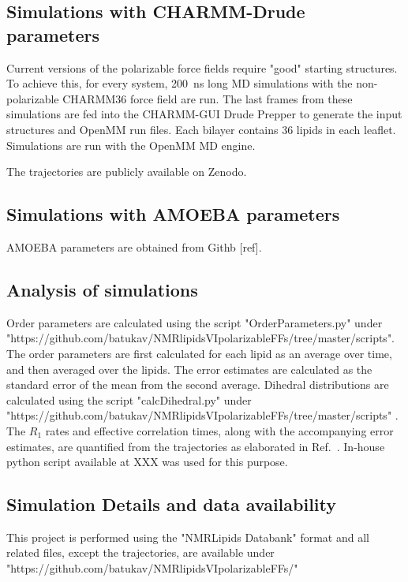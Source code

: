 \documentclass[journal=jacsat,manuscript=article,layout=singlecolumn]{achemso}
\begin{document}
\subsection{Simulations with CHARMM-Drude parameters}





Current versions of the polarizable force fields require "good" starting structures. To achieve this, for every system, 200~ns long MD simulations with the non-polarizable CHARMM36 force field are run. The last frames from these simulations are fed into the CHARMM-GUI Drude Prepper to generate the input structures and OpenMM run files. Each bilayer contains 36 lipids in each leaflet. Simulations are run with the OpenMM MD engine. 

The trajectories are publicly available on Zenodo.

\subsection{Simulations with AMOEBA parameters}


AMOEBA parameters are obtained from Githb [ref]. 

\subsection{Analysis of simulations}
Order parameters are calculated using the script "OrderParameters.py" under\\ "https://github.com/batukav/NMRlipidsVIpolarizableFFs/tree/master/scripts". \\
The order parameters are first calculated for each lipid as an average over time, and then averaged over the lipids. The error estimates are calculated as the standard error of the mean from the second average.
Dihedral distributions are calculated using the script "calcDihedral.py" under\\ "https://github.com/batukav/NMRlipidsVIpolarizableFFs/tree/master/scripts" .\\
The $R_{1}$ rates and effective correlation times, along with the accompanying error estimates, are quantified from the trajectories as elaborated in Ref.~. In-house python script available at XXX was used for this purpose.
\subsection{Simulation Details and data availability}
This project is performed using the "NMRLipids Databank" format and all related files, except the trajectories, are available under\\ "https://github.com/batukav/NMRlipidsVIpolarizableFFs/"
\end{document}
